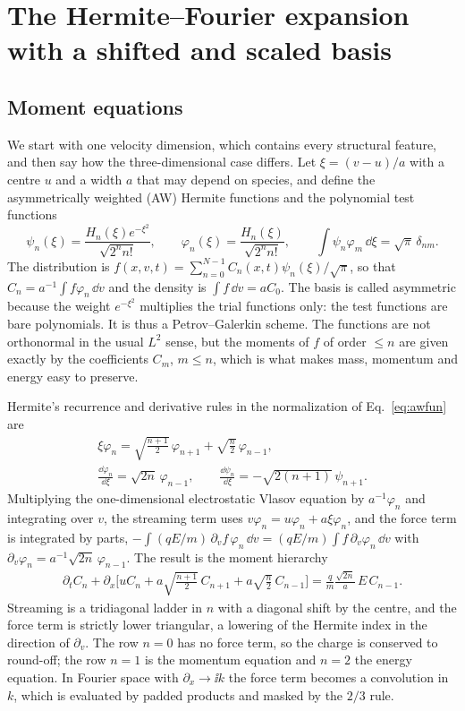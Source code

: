 \section{The Hermite--Fourier expansion with a shifted and scaled basis}\label{sec:hermite}

\subsection{Moment equations}

We start with one velocity dimension, which contains every structural feature, and then say how the three-dimensional case differs. Let $\xi=(v-u)/a$ with a centre $u$ and a width $a$ that may depend on species, and define the asymmetrically weighted (AW) Hermite functions and the polynomial test functions
\begin{equation}
\psi_n(\xi)=\frac{H_n(\xi)e^{-\xi^2}}{\sqrt{2^nn!}},\qquad \varphi_n(\xi)=\frac{H_n(\xi)}{\sqrt{2^nn!}},\qquad
\int\psi_n\varphi_m\,\dd\xi=\sqrt\pi\,\delta_{nm}.
\label{eq:awfun}
\end{equation}
The distribution is $f(x,v,t)=\sum_{n=0}^{N-1}C_n(x,t)\psi_n(\xi)/\sqrt\pi$, so that $C_n=a^{-1}\!\int f\varphi_n\,\dd v$ and the density is $\int f\,\dd v=aC_0$. The basis is called asymmetric because the weight $e^{-\xi^2}$ multiplies the trial functions only: the test functions are bare polynomials. It is thus a Petrov--Galerkin scheme. The functions are not orthonormal in the usual $L^2$ sense, but the moments of $f$ of order $\le n$ are given exactly by the coefficients $C_m$, $m\le n$, which is what makes mass, momentum and energy easy to preserve.

Hermite's recurrence and derivative rules in the normalization of Eq.~\eqref{eq:awfun} are
\begin{gather}
\xi\varphi_n=\sqrt{\tfrac{n+1}{2}}\,\varphi_{n+1}+\sqrt{\tfrac n2}\,\varphi_{n-1},\nonumber\\
\frac{\dd\varphi_n}{\dd\xi}=\sqrt{2n}\,\varphi_{n-1},\qquad
\frac{\dd\psi_n}{\dd\xi}=-\sqrt{2(n+1)}\,\psi_{n+1}.
\label{eq:hermrules}
\end{gather}
Multiplying the one-dimensional electrostatic Vlasov equation by $a^{-1}\varphi_n$ and integrating over $v$, the streaming term uses $v\varphi_n=u\varphi_n+a\xi\varphi_n$, and the force term is integrated by parts, $-\int(qE/m)\,\partial_vf\,\varphi_n\,\dd v=(qE/m)\int f\,\partial_v\varphi_n\,\dd v$ with $\partial_v\varphi_n=a^{-1}\sqrt{2n}\,\varphi_{n-1}$. The result is the moment hierarchy
\begin{multline}
\partial_tC_n+\partial_x\Big[uC_n+a\sqrt{\tfrac{n+1}{2}}\,C_{n+1}+a\sqrt{\tfrac n2}\,C_{n-1}\Big]
=\frac{q}{m}\frac{\sqrt{2n}}{a}\,E\,C_{n-1}.
\label{eq:hier}
\end{multline}
Streaming is a tridiagonal ladder in $n$ with a diagonal shift by the centre, and the force term is strictly lower triangular, a lowering of the Hermite index in the direction of $\partial_v$. The row $n=0$ has no force term, so the charge is conserved to round-off; the row $n=1$ is the momentum equation and $n=2$ the energy equation. In Fourier space with $\partial_x\to\ii k$ the force term becomes a convolution in $k$, which is evaluated by padded products and masked by the $2/3$ rule.

